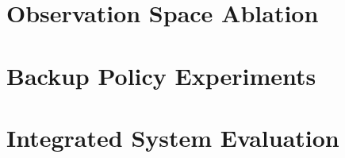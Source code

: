 %
%
%

\section{Observation Space Ablation}\label{sec:exp_ablation}

%
%

\section{Backup Policy Experiments}\label{sec:exp_backup}

%
%
%
%

\section{Integrated System Evaluation}\label{sec:exp_integrated}

